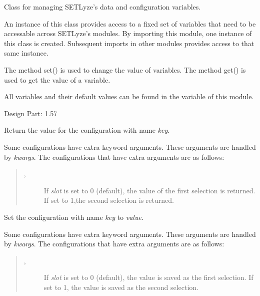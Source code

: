 \documentclass[letterpaper,10pt,english]{sphinxmanual}
\begin{document}
\begin{fulllineitems}
\label{setlyze/config:setlyze.config.ConfigManager}
Class for managing SETLyze's data and configuration variables.

An instance of this class provides access to a fixed set of
variables that need to be accessable across SETLyze's modules. By
importing this module, one instance of this class is created.
Subsequent imports in other modules provides access to that same
instance.

The method set() is used to change the value of variables. The
method get() is used to get the value of a variable.

All variables and their default values can be found in the variable
 of this module.

Design Part: 1.57

\begin{fulllineitems}
\label{setlyze/config:setlyze.config.ConfigManager.get}
Return the value for the configuration with name \emph{key}.

Some configurations have extra keyword arguments. These
arguments are handled by \emph{kwargs}. The configurations that have
extra arguments are as follows:
\begin{quote}
\begin{description}
\item[{, }] \leavevmode
If \emph{slot} is set to 0 (default), the value of the
first selection is returned. If set to 1,the second
selection is returned.

\end{description}
\end{quote}

\end{fulllineitems}


\begin{fulllineitems}
\label{setlyze/config:setlyze.config.ConfigManager.set}
Set the configuration with name \emph{key} to \emph{value}.

Some configurations have extra keyword arguments. These
arguments are handled by \emph{kwargs}. The configurations that have
extra arguments are as follows:
\begin{quote}
\begin{description}
\item[{, }] \leavevmode
If \emph{slot} is set to 0 (default), the value is saved
as the first selection. If set to 1, the value is saved
as the second selection.


\end{description}
\end{quote}
\end{fulllineitems}
\end{fulllineitems}
\end{document}
